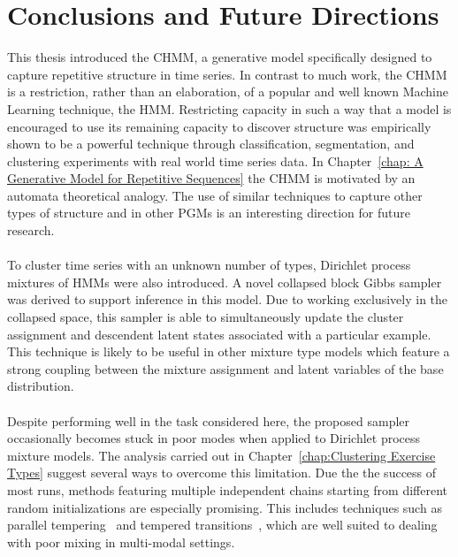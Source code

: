 \documentclass[12pt]{report}
\newcommand{\1}[0]{\mathbbm{1}}
\begin{document}
\chapter{Conclusions and Future Directions}
\label{chap:Conclusion}
This thesis introduced the \ac{CHMM}, a generative model specifically designed to
capture repetitive structure in time series. In contrast to much work, the \ac{CHMM}
is a restriction, rather than an elaboration, of a popular and well known Machine Learning
technique, the \ac{HMM}. Restricting capacity in such a way that a model is encouraged to use
its remaining capacity to discover structure was empirically shown to be a powerful technique
through classification, segmentation, and clustering experiments with real world time series data.
In Chapter~\ref{chap: A Generative Model for Repetitive Sequences} the \ac{CHMM} is motivated
by an automata theoretical analogy. The use of similar techniques to capture other types of
structure and in other \acp{PGM} is an interesting direction for future research.
\\\\
To cluster time series with an unknown number of types, Dirichlet process mixtures of \acp{HMM}
were also introduced. A novel collapsed block Gibbs sampler was derived to support inference in this model.
Due to working exclusively in the collapsed space, this sampler is able to simultaneously update the
cluster assignment and descendent latent states associated with a particular example. This technique is likely to be
useful in other mixture type models which feature a strong coupling between the mixture assignment
and latent variables of the base distribution.
\\\\
Despite performing well in the task considered here, the proposed sampler occasionally becomes stuck
in poor modes when applied to Dirichlet process mixture models. The analysis carried out in
Chapter~\ref{chap:Clustering Exercise Types} suggest several ways to overcome this limitation.
Due the the success of most runs, methods featuring multiple independent chains starting from
different random initializations are especially promising. This includes techniques such
as parallel tempering~\cite{learn-neighbor-mcmc} and tempered transitions~\cite{neal-tempered},
which are well suited to dealing with poor mixing in multi-modal settings.



\end{document}
